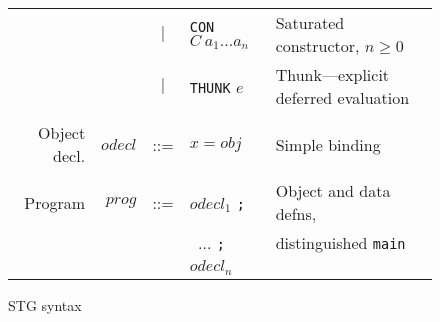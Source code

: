 \documentclass[11pt]{article}
\begin{document}
\begin{figure}
\begin{tabular}{r r c l l}
             &                & $|$ &\texttt{CON} $C\ a_1\dots a_n$                 & Saturated constructor, $n \ge 0$ \\
             &                & $|$ &\texttt{THUNK} $e$                             & Thunk---explicit deferred evaluation \\
\\
Object decl. & $\mathit{odecl}$ & ::=  & $x = \mathit{obj}$                         & Simple binding \\
\\
Program      & $\mathit{prog}$ & ::= & $\mathit{odecl}_1$ \texttt{;}                & Object and data defns, \\
             &                 &     & \texttt{ } $\dots$ \texttt{;}                & distinguished \texttt{main}\\
             &                 &     & $\mathit{odecl}_n$ & 

\end{tabular}
\caption{STG syntax}
\label{fig:STGsyntax}
\end{figure}
\end{document}
